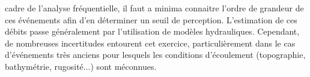 \documentclass[11pt]{article}
\begin{document}
cadre de l'analyse fréquentielle, il faut a minima connaitre l'ordre de grandeur de ces événements afin d'en déterminer un seuil de perception. L'estimation de ces débits passe généralement par l'utilisation de modèles hydrauliques. Cependant, de nombreuses incertitudes entourent cet exercice, particulièrement dans le cas d'événements très anciens pour lesquels les conditions d'écoulement (topographie, bathymétrie, rugosité...) sont méconnues. 
	

%
%


%		
\end{document}
